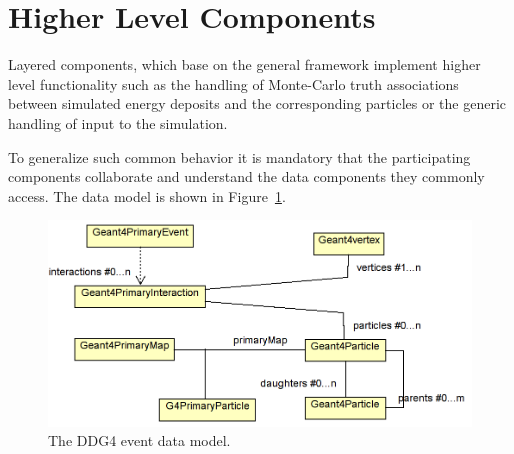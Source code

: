 
\section{Higher Level Components}
\label{sec:ddg4-implementation-higher-level-components}
\noindent
Layered components, which base on the general framework implement higher 
level functionality such as the handling of Monte-Carlo truth associations
between simulated energy deposits and the corresponding particles or the
generic handling of input to the simulation.

\noindent
To generalize such common behavior it is mandatory that the participating
components collaborate and understand the data components they commonly access.
The data model is shown in Figure~\ref{fig:ddg4-event-data-model}.
\begin{figure}[t]
  \begin{center}
    \includegraphics[width=120mm] {DDG4_event_data_model.png}
    \caption{The DDG4 event data model.}
    \label{fig:ddg4-event-data-model}
  \end{center}
\end{figure}

